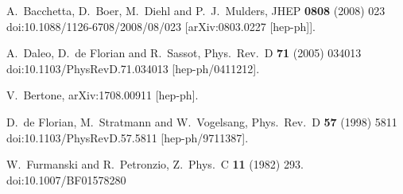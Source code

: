 \documentclass[10pt,a4paper]{article}
\begin{document}
\begin{thebibliography}{alp}
  A.~Bacchetta, D.~Boer, M.~Diehl and P.~J.~Mulders,
  JHEP {\bf 0808} (2008) 023
  doi:10.1088/1126-6708/2008/08/023
  [arXiv:0803.0227 [hep-ph]].

  A.~Daleo, D.~de Florian and R.~Sassot,
  Phys.\ Rev.\ D {\bf 71} (2005) 034013
  doi:10.1103/PhysRevD.71.034013
  [hep-ph/0411212].

  V.~Bertone,
  arXiv:1708.00911 [hep-ph].

  D.~de Florian, M.~Stratmann and W.~Vogelsang,
  Phys.\ Rev.\ D {\bf 57} (1998) 5811
  doi:10.1103/PhysRevD.57.5811
  [hep-ph/9711387].

  W.~Furmanski and R.~Petronzio,
  Z.\ Phys.\ C {\bf 11} (1982) 293.
  doi:10.1007/BF01578280

\end{thebibliography}
\end{document}
